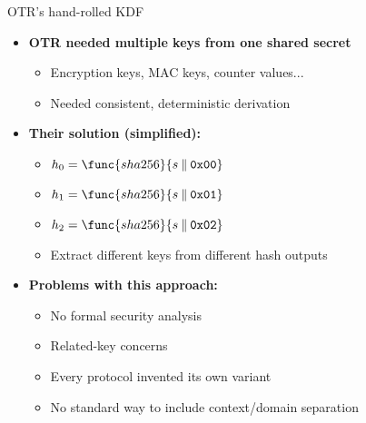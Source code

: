 \documentclass[aspectratio=169, lualatex, handout]{beamer}
\begin{document}
\begin{frame}{OTR's hand-rolled KDF}
	\begin{itemize}
		\item \textbf{OTR needed multiple keys from one shared secret}
		      \begin{itemize}
			      \item Encryption keys, MAC keys, counter values...
			      \item Needed consistent, deterministic derivation
		      \end{itemize}
		\item \textbf{Their solution (simplified):}
		      \begin{itemize}
			      \item $h_0 = \func{sha256}{s \mathbin{\|} \texttt{0x00}}$
			      \item $h_1 = \func{sha256}{s \mathbin{\|} \texttt{0x01}}$
			      \item $h_2 = \func{sha256}{s \mathbin{\|} \texttt{0x02}}$
			      \item Extract different keys from different hash outputs
		      \end{itemize}
		\item \textbf{Problems with this approach:}
		      \begin{itemize}
			      \item No formal security analysis
			      \item Related-key concerns
			      \item Every protocol invented its own variant
			      \item No standard way to include context/domain separation
		      \end{itemize}
	\end{itemize}
\end{frame}
\end{document}
